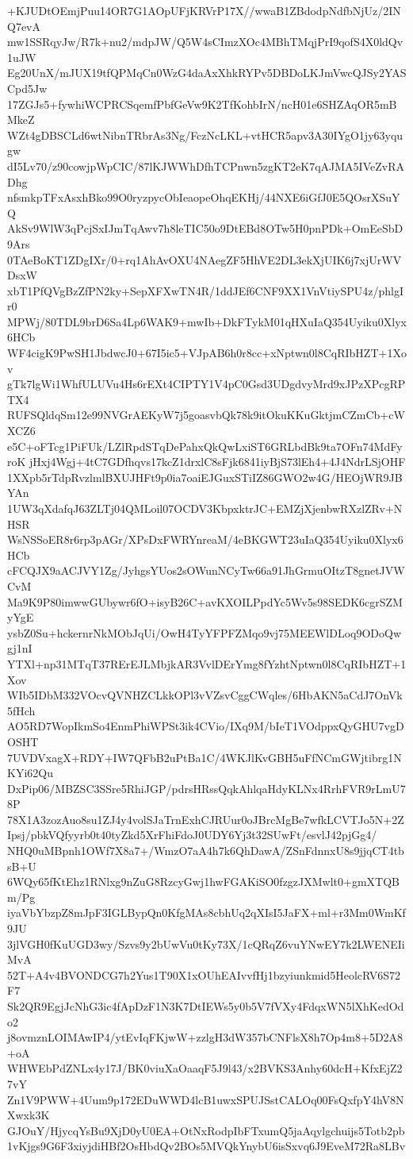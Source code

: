+KJUDtOEmjPuu14OR7G1AOpUFjKRVrP17X//wwaB1ZBdodpNdfbNjUz/2INQ7evA
mw1SSRqyJw/R7k+nu2/mdpJW/Q5W4sCImzXOc4MBhTMqjPrI9qofS4X0ldQv1uJW
Eg20UnX/mJUX19tfQPMqCn0WzG4daAxXhkRYPv5DBDoLKJmVwcQJSy2YASCpd5Jw
17ZGJs5+fywhiWCPRCSqemfPbfGeVw9K2TfKohbIrN/ncH01e6SHZAqOR5mBMkeZ
WZt4gDBSCLd6wtNibnTRbrAs3Ng/FczNcLKL+vtHCR5apv3A30IYgO1jy63yqugw
dI5Lv70/z90cowjpWpCIC/87lKJWWhDfhTCPnwn5zgKT2eK7qAJMA5IVeZvRADhg
nfsmkpTFxAsxhBko99O0ryzpycObIeaopeOhqEKHj/44NXE6iGfJ0E5QOsrXSuYQ
AkSv9WlW3qPcjSxIJmTqAwv7h8leTIC50o9DtEBd8OTw5H0pnPDk+OmEeSbD9Ars
0TAeBoKT1ZDgIXr/0+rq1AhAvOXU4NAegZF5HhVE2DL3ekXjUIK6j7xjUrWVDsxW
xbT1PfQVgBzZfPN2ky+SepXFXwTN4R/1ddJEf6CNF9XX1VnVtiySPU4z/phlgIr0
MPWj/80TDL9brD6Sa4Lp6WAK9+mwIb+DkFTykM01qHXuIaQ354Uyiku0Xlyx6HCb
WF4cigK9PwSH1JbdwcJ0+67I5ic5+VJpAB6h0r8cc+xNptwn0l8CqRIbHZT+1Xov
gTk7lgWi1WhfULUVu4Hs6rEXt4CIPTY1V4pC0Gsd3UDgdvyMrd9xJPzXPcgRPTX4
RUFSQldqSm12e99NVGrAEKyW7j5goasvbQk78k9itOkuKKuGktjmCZmCb+cWXCZ6
e5C+oFTcg1PiFUk/LZlRpdSTqDePahxQkQwLxiST6GRLbdBk9ta7OFn74MdFyroK
jHxj4Wgj+4tC7GDfhqvs17kcZ1drxlC8sFjk6841iyBjS73lEh4+4J4NdrLSjOHF
1XXpb5rTdpRvzlmlBXUJHFt9p0ia7oaiEJGuxSTiIZ86GWO2w4G/HEOjWR9JBYAn
1UW3qXdafqJ63ZLTj04QMLoil07OCDV3KbpxktrJC+EMZjXjenbwRXzlZRv+NHSR
WsNSSoER8r6rp3pAGr/XPsDxFWRYnreaM/4eBKGWT23uIaQ354Uyiku0Xlyx6HCb
cFCQJX9aACJVY1Zg/JyhgsYUos2sOWunNCyTw66a91JhGrmuOItzT8gnetJVWCvM
Ma9K9P80imwwGUbywr6fO+isyB26C+avKXOILPpdYc5Wv5s98SEDK6cgrSZMyYgE
ysbZ0Su+hckernrNkMObJqUi/OwH4TyYFPFZMqo9vj75MEEWlDLoq9ODoQwgj1nI
YTXl+np31MTqT37RErEJLMbjkAR3VvlDErYmg8fYzhtNptwn0l8CqRIbHZT+1Xov
WIb5IDbM332VOcvQVNHZCLkkOPl3vVZsvCggCWqles/6HbAKN5aCdJ7OnVk5fHch
AO5RD7WopIkmSo4EnmPhiWPSt3ik4CVio/IXq9M/bIeT1VOdppxQyGHU7vgDOSHT
7UVDVxagX+RDY+IW7QFbB2uPtBa1C/4WKJlKvGBH5uFfNCmGWjtibrg1NKYi62Qu
DxPip06/MBZSC3SSre5RhiJGP/pdrsHRssQqkAhlqaHdyKLNx4RrhFVR9rLmU78P
78X1A3zozAuo8su1ZJ4y4volSJaTrnExhCJRUur0oJBrcMgBe7wfkLCVTJo5N+2Z
Ipsj/pbkVQfyyrb0t40tyZkd5XrFhiFdoJ0UDY6Yj3t32SUwFt/esvlJ42pjGg4/
NHQ0uMBpnh1OWf7X8a7+/WmzO7aA4h7k6QhDawA/ZSnFdnnxU8s9jjqCT4tbsB+U
6WQy65fKtEhz1RNlxg9nZuG8RzcyGwj1hwFGAKiSO0fzgzJXMwlt0+gmXTQBm/Pg
iyaVbYbzpZ8mJpF3IGLBypQn0KfgMAs8cbhUq2qXIsI5JaFX+ml+r3Mm0WmKf9JU
3jlVGH0fKuUGD3wy/Szvs9y2bUwVu0tKy73X/1cQRqZ6vuYNwEY7k2LWENEIiMvA
52T+A4v4BVONDCG7h2Yus1T90X1xOUhEAIvvfHj1bzyiunkmid5HeolcRV6S72F7
Sk2QR9EgjJcNhG3ic4fApDzF1N3K7DtIEWs5y0b5V7fVXy4FdqxWN5lXhKedOdo2
j8ovmznLOIMAwIP4/ytEvIqFKjwW+zzlgH3dW357bCNFlsX8h7Op4m8+5D2A8+oA
WHWEbPdZNLx4y17J/BK0viuXaOaaqF5J9l43/x2BVKS3Anhy60dcH+KfxEjZ27vY
Zn1V9PWW+4Uum9p172EDuWWD4lcB1uwxSPUJSstCALOq00FsQxfpY4hV8NXwxk3K
GJOuY/HjycqYsBu9XjD0yU0EA+OtNxRodpIbFTxumQ5jaAqylgchuijs5Totb2pb
1vKjgs9G6F3xiyjdiHBf2OsHbdQv2BOs5MVQkYnybU6isSxvq6J9EveM72Ra8LBv
